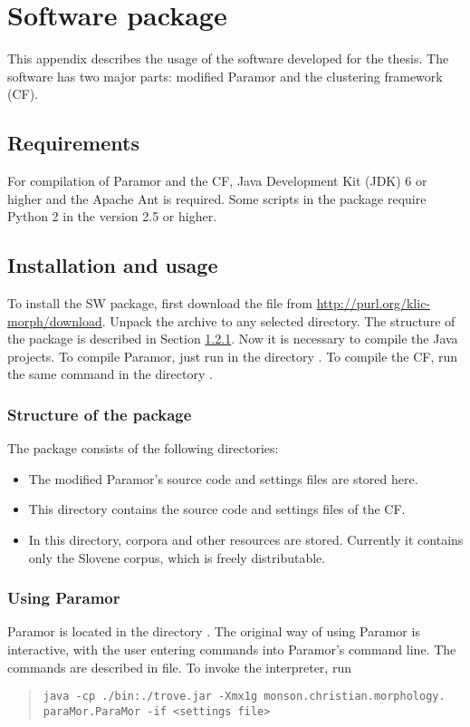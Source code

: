 \chapter{Software package}\label{chapter:swpkg}

This appendix describes the usage of the software developed for the thesis. The software has two major parts: modified Paramor and the clustering framework (CF).

\section{Requirements}
For compilation of Paramor and the CF, Java Development Kit (JDK) 6 or higher and the Apache Ant is required. Some scripts in the package require Python 2 in the version 2.5 or higher.

\section{Installation and usage}
To install the SW package, first download the file  from \url{http://purl.org/klic-morph/download}. Unpack the archi\-ve to any selected directory. The structure of the package is described in Section \ref{section:sw_struct}. Now it is necessary to compile the Java projects.
To compile Paramor, just run  in the directory . To compile the CF, run the same command in the directory .

\subsection{Structure of the package}\label{section:sw_struct}
The package consists of the following directories:
\begin{itemize}
\item {} The modified Paramor's source code and settings files are stored here.
\item {} This directory contains the source code and settings files of the CF.
\item {} In this directory, corpora and other resources are stored. Currently it contains only the Slovene corpus, which is freely distributable.
\end{itemize}

\subsection{Using Paramor}
Paramor is located in the directory . The original way of using Paramor is interactive, with the user entering commands into  Paramor's command line. The commands are described in  file. To invoke the interpreter, run
\begin{quote}
\tt java -cp ./bin:./trove.jar -Xmx1g monson.christian.morphology. paraMor.ParaMor -if <settings file>
\end{quote}

